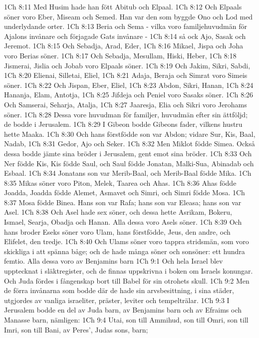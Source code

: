 1Ch 8:11  Med Husim hade han fött Abitub och Elpaal.
1Ch 8:12  Och Elpaals söner voro Eber, Miseam och Semed. Han var den som byggde Ono och Lod med underlydande orter.
1Ch 8:13  Beria och Sema - vilka voro familjehuvudmän för Ajalons invånare och förjagade Gats invånare -
1Ch 8:14  så ock Ajo, Sasak och Jeremot.
1Ch 8:15  Och Sebadja, Arad, Eder,
1Ch 8:16  Mikael, Jispa och Joha voro Berias söner.
1Ch 8:17  Och Sebadja, Mesullam, Hiski, Heber,
1Ch 8:18  Jismerai, Jislia och Jobab voro Elpaals söner.
1Ch 8:19  Och Jakim, Sikri, Sabdi,
1Ch 8:20  Elienai, Silletai, Eliel,
1Ch 8:21  Adaja, Beraja och Simrat voro Simeis söner.
1Ch 8:22  Och Jispan, Eber, Eliel,
1Ch 8:23  Abdon, Sikri, Hanan,
1Ch 8:24  Hananja, Elam, Antotja,
1Ch 8:25  Jifdeja och Peniel voro Sasaks söner.
1Ch 8:26  Och Samserai, Seharja, Atalja,
1Ch 8:27  Jaaresja, Elia och Sikri voro Jerohams söner.
1Ch 8:28  Dessa vore huvudman för familjer, huvudmän efter sin ättföljd; de bodde i Jerusalem.
1Ch 8:29  I Gibeon bodde Gibeons fader, vilkens hustru hette Maaka.
1Ch 8:30  Och hans förstfödde son var Abdon; vidare Sur, Kis, Baal, Nadab,
1Ch 8:31  Gedor, Ajo och Seker.
1Ch 8:32  Men Miklot födde Simea. Också dessa bodde jämte sina bröder i Jerusalem, gent emot sina bröder.
1Ch 8:33  Och Ner födde Kis, Kis födde Saul, och Saul födde Jonatan, Malki-Sua, Abinadab och Esbaal.
1Ch 8:34  Jonatans son var Merib-Baal, och Merib-Baal födde Mika.
1Ch 8:35  Mikas söner voro Piton, Melek, Taarea och Ahas.
1Ch 8:36  Ahas födde Joadda, Joadda födde Alemet, Asmavet och Simri, och Simri födde Mosa.
1Ch 8:37  Mosa födde Binea. Hans son var Rafa; hans son var Eleasa; hans son var Asel.
1Ch 8:38  Och Asel hade sex söner, och dessa hette Asrikam, Bokeru, Ismael, Searja, Obadja och Hanan. Alla dessa voro Asels söner.
1Ch 8:39  Och hans broder Eseks söner voro Ulam, hans förstfödde, Jeus, den andre, och Elifelet, den tredje.
1Ch 8:40  Och Ulams söner voro tappra stridsmän, som voro skickliga i att spänna båge; och de hade många söner och sonsöner: ett hundra femtio. Alla dessa voro av Benjamins barn
1Ch 9:1  Och hela Israel blev upptecknat i släktregister, och de finnas uppskrivna i boken om Israels konungar. Och Juda fördes i fångenskap bort till Babel för sin otrohets skull.
1Ch 9:2  Men de förra invånarna som bodde där de hade sin arvsbesittning, i sina städer, utgjordes av vanliga israeliter, präster, leviter och tempelträlar.
1Ch 9:3  I Jerusalem bodde en del av Juda barn, av Benjamins barn och av Efraims och Manasse barn, nämligen:
1Ch 9:4  Utai, son till Ammihud, son till Omri, son till Imri, son till Bani, av Peres', Judas sons, barn;
